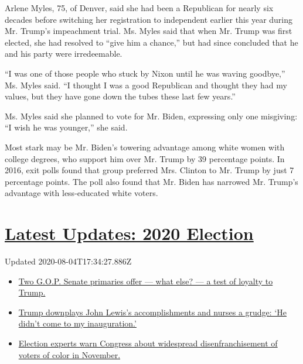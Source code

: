 Arlene Myles, 75, of Denver, said she had been a Republican for nearly
six decades before switching her registration to independent earlier
this year during Mr. Trump's impeachment trial. Ms. Myles said that when
Mr. Trump was first elected, she had resolved to ``give him a chance,''
but had since concluded that he and his party were irredeemable.

``I was one of those people who stuck by Nixon until he was waving
goodbye,'' Ms. Myles said. ``I thought I was a good Republican and
thought they had my values, but they have gone down the tubes these last
few years.''

Ms. Myles said she planned to vote for Mr. Biden, expressing only one
misgiving: ``I wish he was younger,'' she said.

Most stark may be Mr. Biden's towering advantage among white women with
college degrees, who support him over Mr. Trump by 39 percentage points.
In 2016, exit polls found that group preferred Mrs. Clinton to Mr. Trump
by just 7 percentage points. The poll also found that Mr. Biden has
narrowed Mr. Trump's advantage with less-educated white voters.

\hypertarget{latest-updates-2020-election}{%
\section{\texorpdfstring{\href{https://www.nytimes.com/2020/08/04/us/elections/primary-election-michigan-arizona-kansas.html?action=click\&pgtype=Article\&state=default\&region=MAIN_CONTENT_1\&context=storylines_live_updates}{Latest
Updates: 2020
Election}}{Latest Updates: 2020 Election}}\label{latest-updates-2020-election}}

Updated 2020-08-04T17:34:27.886Z

\begin{itemize}
\tightlist
\item
  \href{https://www.nytimes.com/2020/08/04/us/elections/primary-election-michigan-arizona-kansas.html?action=click\&pgtype=Article\&state=default\&region=MAIN_CONTENT_1\&context=storylines_live_updates\#link-3924dd44}{Two
  G.O.P. Senate primaries offer --- what else? --- a test of loyalty to
  Trump.}
\item
  \href{https://www.nytimes.com/2020/08/04/us/elections/primary-election-michigan-arizona-kansas.html?action=click\&pgtype=Article\&state=default\&region=MAIN_CONTENT_1\&context=storylines_live_updates\#link-24333e8c}{Trump
  downplays John Lewis's accomplishments and nurses a grudge: `He didn't
  come to my inauguration.'}
\item
  \href{https://www.nytimes.com/2020/08/04/us/elections/primary-election-michigan-arizona-kansas.html?action=click\&pgtype=Article\&state=default\&region=MAIN_CONTENT_1\&context=storylines_live_updates\#link-6d019753}{Election
  experts warn Congress about widespread disenfranchisement of voters of
  color in November.}
\end{itemize}

